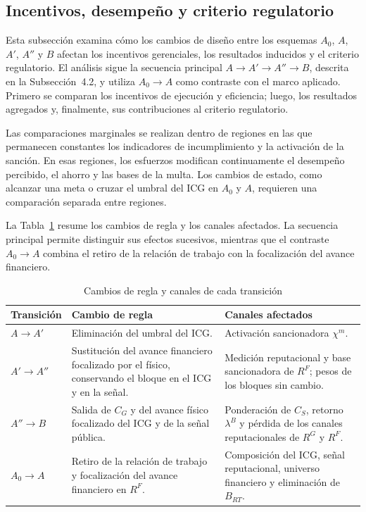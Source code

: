\subsection{Incentivos, desempeño y criterio regulatorio}

Esta subsección examina cómo los cambios de diseño entre los esquemas \(A_0\), \(A\), \(A'\), \(A''\) y \(B\) afectan los incentivos gerenciales, los resultados inducidos y el criterio regulatorio. El análisis sigue la secuencia principal \(A\to A'\to A''\to B\), descrita en la Subsección~4.2, y utiliza \(A_0\to A\) como contraste con el marco aplicado. Primero se comparan los incentivos de ejecución y eficiencia; luego, los resultados agregados y, finalmente, sus contribuciones al criterio regulatorio.

Las comparaciones marginales se realizan dentro de regiones en las que permanecen constantes los indicadores de incumplimiento y la activación de la sanción. En esas regiones, los esfuerzos modifican continuamente el desempeño percibido, el ahorro y las bases de la multa. Los cambios de estado, como alcanzar una meta o cruzar el umbral del ICG en \(A_0\) y \(A\), requieren una comparación separada entre regiones.

La Tabla~\ref{tab:mapa_transiciones} resume los cambios de regla y los canales afectados. La secuencia principal permite distinguir sus efectos sucesivos, mientras que el contraste \(A_0\to A\) combina el retiro de la relación de trabajo con la focalización del avance financiero.

\begin{table}[t]
\centering
\caption{Cambios de regla y canales de cada transición}
\label{tab:mapa_transiciones}
\small
\renewcommand{\arraystretch}{1.20}
\begin{tabularx}{\textwidth}{@{}lXX@{}}
\hline
\textbf{Transición} & \textbf{Cambio de regla} & \textbf{Canales afectados}\\
\hline
\(A\to A'\) & Eliminación del umbral del ICG. & Activación sancionadora \(\chi^m\).\\
\(A'\to A''\) & Sustitución del avance financiero focalizado por el físico, conservando el bloque en el ICG y en la señal. & Medición reputacional y base sancionadora de \(R^F\); pesos de los bloques sin cambio.\\
\(A''\to B\) & Salida de \(C_G\) y del avance físico focalizado del ICG y de la señal pública. & Ponderación de \(C_S\), retorno \(\lambda^B\) y pérdida de los canales reputacionales de \(R^G\) y \(R^F\).\\
\(A_0\to A\) & Retiro de la relación de trabajo y focalización del avance financiero en \(R^F\). & Composición del ICG, señal reputacional, universo financiero y eliminación de \(B_{RT}\).\\
\hline
\end{tabularx}
\end{table}

